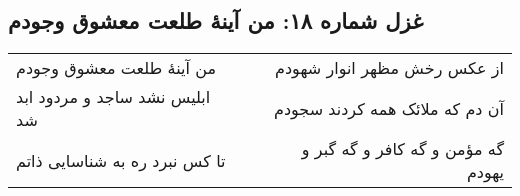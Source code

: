 \begin{center}
\section*{غزل شماره ۱۸: من آینهٔ طلعت معشوق وجودم}
\label{sec:018}
\begin{longtable}{l p{0.5cm} r}
من آینهٔ طلعت معشوق وجودم
&&
از عکس رخش مظهر انوار شهودم
\\
ابلیس نشد ساجد و مردود ابد شد
&&
آن دم که ملائک همه کردند سجودم
\\
تا کس نبرد ره به شناسایی ذاتم
&&
گه مؤمن و گه کافر و گه گبر و یهودم
\\
\end{longtable}
\end{center}
